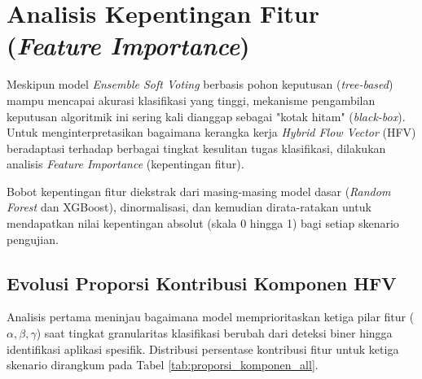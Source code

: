 \section{Analisis Kepentingan Fitur (\textit{Feature Importance})}
\label{sec:feature_importance}

Meskipun model \textit{Ensemble Soft Voting} berbasis pohon keputusan (\textit{tree-based}) mampu mencapai akurasi klasifikasi yang tinggi, mekanisme pengambilan keputusan algoritmik ini sering kali dianggap sebagai "kotak hitam" (\textit{black-box}). Untuk menginterpretasikan bagaimana kerangka kerja \textit{Hybrid Flow Vector} (HFV) beradaptasi terhadap berbagai tingkat kesulitan tugas klasifikasi, dilakukan analisis \textit{Feature Importance} (kepentingan fitur).

Bobot kepentingan fitur diekstrak dari masing-masing model dasar (\textit{Random Forest} dan XGBoost), dinormalisasi, dan kemudian dirata-ratakan untuk mendapatkan nilai kepentingan absolut (skala 0 hingga 1) bagi setiap skenario pengujian.

\subsection{Evolusi Proporsi Kontribusi Komponen HFV}

Analisis pertama meninjau bagaimana model memprioritaskan ketiga pilar fitur ($\alpha, \beta, \gamma$) saat tingkat granularitas klasifikasi berubah dari deteksi biner hingga identifikasi aplikasi spesifik. Distribusi persentase kontribusi fitur untuk ketiga skenario dirangkum pada Tabel \ref{tab:proporsi_komponen_all}.

\begin{table}[htbp]
    \centering
    \footnotesize
    \caption{Evolusi Tingkat Kepentingan Komponen Fitur pada Tiga Skenario Pengujian}
    \label{tab:proporsi_komponen_all}
\end{table}

